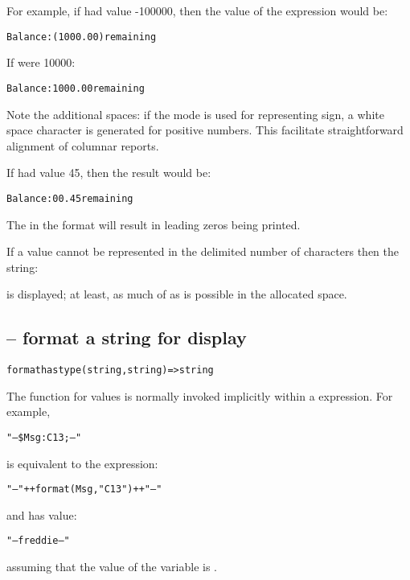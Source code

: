 For example, if  had value -100000, then the value of the expression would be:
\begin{alltt}
Balance: (1000.00) remaining
\end{alltt}
If  were 10000:
\begin{alltt}
Balance:  1000.00  remaining
\end{alltt}
\begin{aside}
Note the additional spaces: if the   mode is used for representing sign, a white space character is generated for positive numbers. This facilitate straightforward alignment of columnar reports.
\end{aside}
If  had value 45, then the result would be:
\begin{alltt}
Balance:  00.45  remaining
\end{alltt}
The  in the format will result in leading zeros being printed.
\begin{aside}
If a value cannot be represented in the delimited number of characters then the string:
\begin{alltt}
\end{alltt}
is displayed; at least, as much of  as is possible in the allocated space.\end{aside}


\subsection{ -- format a string for display}
\label{formatStringFunction}
\begin{alltt}
format has type (string,string)=>string
\end{alltt}

\begin{aside}
The  function for  values is normally invoked implicitly within a   expression. For example,
\begin{alltt}
"--\$Msg:C13;--"
\end{alltt}
is equivalent to the expression:
\begin{alltt}
"--"++format(Msg,"C13")++"--"
\end{alltt}
and has value:
\begin{alltt}
"--   freddie   --"
\end{alltt}
assuming that the value of the  variable is .
\end{aside}

